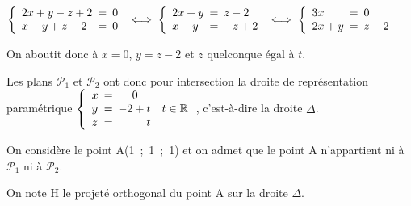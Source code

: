 \documentclass[10pt]{article}
\providecommand{\R}{\mathbb{R}}
\begin{document}
\begin{enumerate}
\begin{enumerate}
$\left \{
\begin{array}{l !{=} l}
2x+y-z +2 & 0\\
x - y + z - 2&0
\end{array}
\right .
\iff
\left \{
\begin{array}{l !{=} l}
2x+y & z-2\\
x - y &-z+2
\end{array}
\right .
\iff
\left \{
\begin{array}{l !{=} l}
3x&0\\
2x+y & z-2
\end{array}
\right .$

On aboutit donc à $x=0$, $y=z-2$ et $z$ quelconque égal à $t$.

Les plans $\mathcal{P}_1$ et $\mathcal{P}_2$ ont donc pour intersection la droite de représentation paramétrique 
$\left \{
\begin{array}{l !{=} r l}
x & 0\phantom{+t}\\
y & -2+t & t\in\R\\
z & t
\end{array}
\right.$, c'est-à-dire la droite $\Delta$.
	\end{enumerate}
	\end{enumerate}
	
On considère le point A(1~;~1~;~1) et on admet que le point A n'appartient ni à $\mathcal{P}_1$ ni à $\mathcal{P}_2$.

On note H le projeté orthogonal du point A sur la droite $\Delta$.
\end{document}
